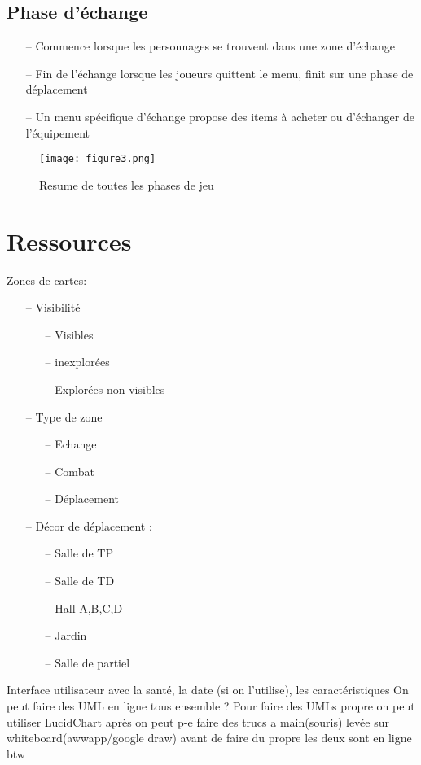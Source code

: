 \documentclass{article}
\begin{document}
\subsection{Phase d'échange}
\begin{itemize}
\item [--]Commence lorsque les personnages se trouvent dans une zone d’échange
\item [--]Fin de l’échange lorsque les joueurs quittent le menu, finit sur une phase de déplacement
\item [--]Un menu spécifique d’échange propose des items à acheter ou d’échanger de l’équipement 
\end{itemize}
\begin{figure}[!ht]
\begin{center}
\texttt{[image: figure3.png]}
\end{center}
\caption{Resume de toutes les phases de jeu}
\label{Resume de toutes les phases de jeu}
\end{figure}
\newpage
\section{Ressources}
Zones de cartes:
\begin{itemize} \item [--] Visibilité
	\begin{itemize} \item [--] Visibles
				\item [--] inexplorées
				\item [--] Explorées non visibles
	\end{itemize}
	\item[--]{Type de zone}
	\begin{itemize}
\item [--] Echange
\item [--] Combat
\item [--] Déplacement
\end{itemize}
\item [--]Décor de déplacement : 
\begin{itemize}
\item [--]Salle de TP
\item [--]Salle de TD
\item [--]Hall A,B,C,D
\item [--] Jardin
\item [--] Salle de partiel		
\end{itemize}
\end{itemize}	
Interface utilisateur avec la santé, la date (si on l’utilise), les caractéristiques
On peut faire des UML en ligne tous ensemble ?
Pour faire des UMLs propre on peut utiliser LucidChart
après on peut p-e faire des trucs a main(souris) levée sur whiteboard(awwapp/google draw) avant de faire du propre
les deux sont en ligne btw 
\end{document}
